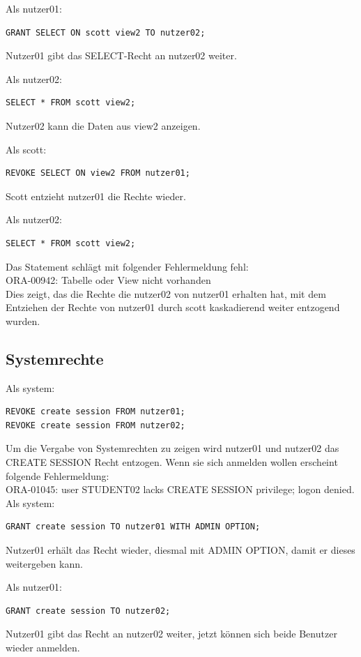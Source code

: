 \documentclass[10pt]{scrreprt}
\begin{document}
Als nutzer01:
\begin{lstlisting}[style=sql]
GRANT SELECT ON scott view2 TO nutzer02;
\end{lstlisting}
Nutzer01 gibt das SELECT-Recht an nutzer02 weiter.

Als nutzer02:
\begin{lstlisting}[style=sql]
SELECT * FROM scott view2;
\end{lstlisting}
Nutzer02 kann die Daten aus view2 anzeigen.

Als scott:
\begin{lstlisting}[style=sql]
REVOKE SELECT ON view2 FROM nutzer01;
\end{lstlisting}
Scott entzieht nutzer01 die Rechte wieder.

Als nutzer02:
\begin{lstlisting}[style=sql]
SELECT * FROM scott view2;
\end{lstlisting}
Das Statement schlägt mit folgender Fehlermeldung fehl:\\
ORA-00942: Tabelle oder View nicht vorhanden\\
Dies zeigt, das die Rechte die nutzer02 von nutzer01 erhalten hat, mit dem Entziehen der Rechte von nutzer01 durch scott kaskadierend weiter entzogend wurden.

\subsection{Systemrechte}
Als system:
\begin{lstlisting}[style=sql]
REVOKE create session FROM nutzer01;
REVOKE create session FROM nutzer02;
\end{lstlisting}
Um die Vergabe von Systemrechten zu zeigen wird nutzer01 und nutzer02 das CREATE SESSION Recht entzogen. Wenn sie sich anmelden wollen erscheint folgende Fehlermeldung:\\
ORA-01045: user STUDENT02 lacks CREATE SESSION privilege; logon denied.\\

Als system:
\begin{lstlisting}[style=sql]
GRANT create session TO nutzer01 WITH ADMIN OPTION;
\end{lstlisting}
Nutzer01 erhält das Recht wieder, diesmal mit ADMIN OPTION, damit er dieses weitergeben kann.

Als nutzer01:
\begin{lstlisting}[style=sql]
GRANT create session TO nutzer02;
\end{lstlisting}
Nutzer01 gibt das Recht an nutzer02 weiter, jetzt können sich beide Benutzer wieder anmelden.
\end{document}
